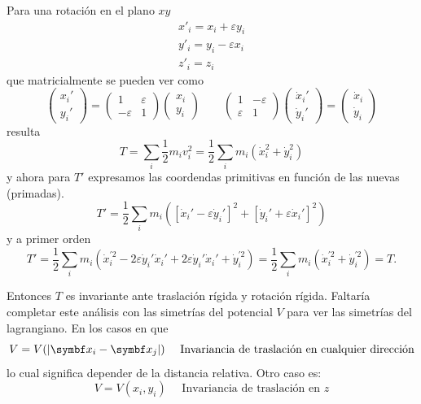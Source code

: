 \documentclass[10pt,oneside]{CBFT_book}
\begin{document}
Para una rotación en el plano $xy$
\begin{eqnarray*}
	x'_i = x_i + \varepsilon y_i \\
	y'_i = y_i - \varepsilon x_i \\
	z'_i = z_i 
\end{eqnarray*}
que matricialmente se pueden ver como 
\[
	\begin{pmatrix}
	x_i'\\
	y_i'
	\end{pmatrix}
	=
	\begin{pmatrix}
	 1 & \varepsilon \\
	 -\varepsilon & 1
	\end{pmatrix}
	\begin{pmatrix}
	 x_i \\
	 y_i
	\end{pmatrix}
	\qquad 
	\begin{pmatrix}
	 1 & -\varepsilon \\
	 \varepsilon & 1
	\end{pmatrix}
	\begin{pmatrix}
	\dot{x}_i'\\
	\dot{y}_i'
	\end{pmatrix}
	=
	\begin{pmatrix}
	\dot{x}_i \\
	\dot{y}_i
	\end{pmatrix}
\]
resulta
\[
	T = \sum_i \frac{1}{2} m_i v_i^2 = \frac{1}{2} \sum_i m_i ( \dot{x}_i^2 + \dot{y}_i^2 )
\]
y ahora para $T'$ expresamos las coordendas primitivas en función de las nuevas (primadas).
\[
	T' = \frac{1}{2} \sum_i m_i ( [\dot{x}_i' - \varepsilon \dot{y}_i' ]^2 + [\dot{y}_i' + \varepsilon 
\dot{x}_i']^2 )
\]
y a primer orden
\[
	T' = \frac{1}{2} \sum_i m_i ( \dot{x}^{'2}_i - 2 \varepsilon \dot{y}_i'\dot{x}_i' + 
 	2 \varepsilon \dot{y}_i'\dot{x}_i' + \dot{y}^{'2}_i ) = 
 	\frac{1}{2} \sum_i m_i( \dot{x}^{'2}_i + \dot{y}^{'2}_i ) = T.
\]

Entonces $T$ es invariante ante traslación rígida y rotación rígida.
Faltaría completar este análisis con las simetrías del potencial $V$ para ver las simetrías del lagrangiano.
En los casos en que 
\[
	V = V(|\vb{x}_i - \vb{x}_j|) \quad \text{ Invariancia de traslación en cualquier dirección} 
\]
lo cual significa depender de la distancia relativa. Otro caso es:
\[
	V = V( x_i, y_i ) \quad \text{ Invariancia de traslación en $z$}
\]
\end{document}
